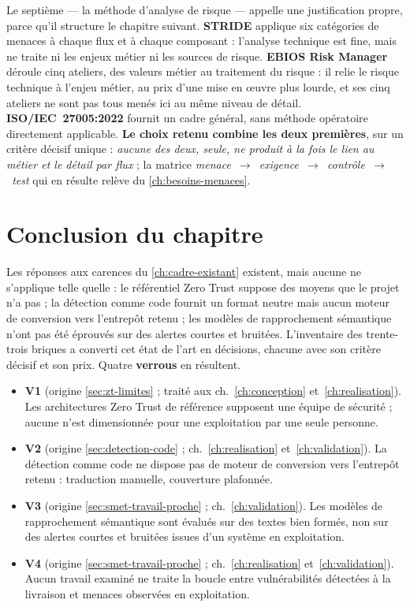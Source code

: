 Le septième --- la méthode d'analyse de risque --- appelle une justification propre, parce qu'il
structure le chapitre suivant. \textbf{STRIDE} \cite{shostack2014} applique six catégories de
menaces à chaque flux et à chaque composant : l'analyse technique est fine, mais ne traite ni les
enjeux métier ni les sources de risque. \textbf{EBIOS Risk Manager} \cite{anssi_ebios_rm2018}
déroule cinq ateliers, des valeurs métier au traitement du risque : il relie le risque technique
à l'enjeu métier, au prix d'une mise en œuvre plus lourde, et ses cinq ateliers ne sont pas tous
menés ici au même niveau de détail. \textbf{ISO/IEC~27005:2022} \cite{iso27005_2022} fournit un
cadre général, sans méthode opératoire directement applicable. \textbf{Le choix retenu combine
les deux premières}, sur un critère décisif unique : \emph{aucune des deux, seule, ne produit à la
fois le lien au métier et le détail par flux} ; la matrice
\emph{menace~$\rightarrow$~exigence~$\rightarrow$~contrôle~$\rightarrow$~test} qui en résulte
relève du \cref{ch:besoins-menaces}.


\section*{Conclusion du chapitre}

Les réponses aux carences du \cref{ch:cadre-existant} existent, mais aucune ne s'applique telle
quelle : le référentiel Zero Trust suppose des moyens que le projet n'a pas ; la détection comme
code fournit un format neutre mais aucun moteur de conversion vers l'entrepôt retenu ; les modèles
de rapprochement sémantique n'ont pas été éprouvés sur des alertes courtes et bruitées.
L'inventaire des trente-trois briques a converti cet état de l'art en décisions, chacune avec son
critère décisif et son prix. Quatre \textbf{verrous} en résultent.

\begin{itemize}\setlength{\itemsep}{0pt}\setlength{\parskip}{0pt}
  \item \textbf{V1} (origine \cref{sec:zt-limites} ; traité aux ch.~\ref{ch:conception}
  et~\ref{ch:realisation}). Les architectures Zero Trust de référence supposent une équipe de
  sécurité ; aucune n'est dimensionnée pour une exploitation par une seule personne.
  \item \textbf{V2} (origine \cref{sec:detection-code} ; ch.~\ref{ch:realisation}
  et~\ref{ch:validation}). La détection comme code ne dispose pas de moteur de conversion vers
  l'entrepôt retenu : traduction manuelle, couverture plafonnée.
  \item \textbf{V3} (origine \cref{sec:smet-travail-proche} ; ch.~\ref{ch:validation}). Les
  modèles de rapprochement sémantique sont évalués sur des textes bien formés, non sur des alertes
  courtes et bruitées issues d'un système en exploitation.
  \item \textbf{V4} (origine \cref{sec:smet-travail-proche} ; ch.~\ref{ch:realisation}
  et~\ref{ch:validation}). Aucun travail examiné ne traite la boucle entre vulnérabilités
  détectées à la livraison et menaces observées en exploitation.
\end{itemize}

